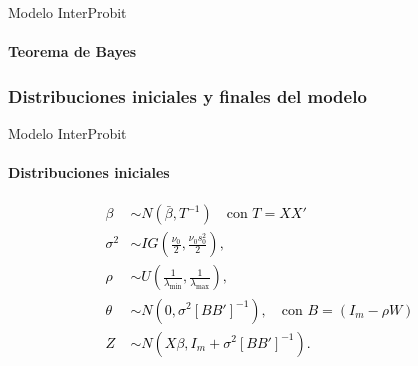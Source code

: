 \setwatermark{\fontsize{10pt}{10pt}\selectfont{ }}
{
%
\begin{frame}

\end{frame}
}
\setwatermark{\fontsize{90pt}{90pt}\selectfont{Bayes}}
\begin{frame}{Modelo InterProbit}
\framesubtitle{Teorema de Bayes}

\end{frame}

\subsubsection{Distribuciones iniciales y finales del modelo}
\setwatermark{\fontsize{70pt}{70pt}\selectfont{priors}}


\begin{frame}[t]{Modelo InterProbit}
\framesubtitle{Distribuciones iniciales}

\hspace*{2 cm}

\textcolor{black}{
\begin{align*}
\beta &\sim N\left( \bar{\beta},T^{-1} \right) \quad \text{con } T = XX'\\
\sigma^2 &\sim IG\left( \frac{\nu_0}{2}, \frac{\nu_0 s_0^2}{2} \right), \\[3pt]
\rho &\sim U \left( \frac{1}{\lambda_{\min}}, \frac{1}{\lambda_{\max}} \right), \\[5pt]
\theta &\sim N \left(0, \sigma^2\left[BB' \right]^{-1} \right), \quad \text{con } B = \left(I_{m} -\rho W \right) \\[5pt]
Z &\sim N \left(X\beta, I_m + \sigma^2 \left[BB' \right]^{-1} \right).
\end{align*}
}

\end{frame}

\setwatermark{\fontsize{70pt}{70pt}\selectfont{posteriors}}

